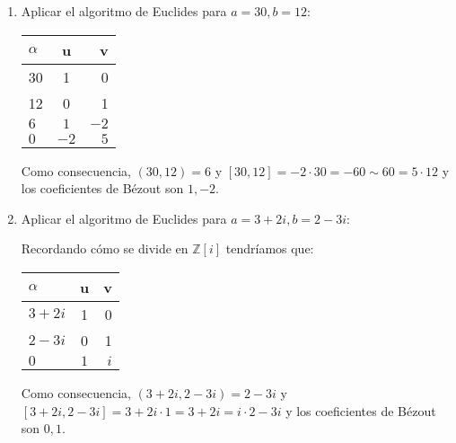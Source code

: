 \begin{example}
\begin{enumerate}
\item Aplicar el algoritmo de Euclides para $a = 30,b = 12$:

\begin{center}
  \begin{tabular}{ | l | c | r |}
    \hline
    $\alpha$ & u & v \\ \hline
    30 & 1 & 0 \\ \hline
    12 & 0 & 1 \\ \hline
    $6$ & $1$ & $-2$ \\ \hline
    $0$ & $-2$ & $5$ \\ \hline
  \end{tabular}
\end{center}

Como consecuencia, $(30,12) = 6$ y $[30,12] = -2 \cdot 30 = -60 \sim 60 = 5 \cdot 12$ y los coeficientes de Bézout son $1,-2$. 

\item Aplicar el algoritmo de Euclides para $a = 3+2i,b = 2-3i$:

Recordando cómo se divide en $\mathbb{Z}[i]$ tendríamos que:

\begin{center}
  \begin{tabular}{ | l | c | r |}
    \hline
    $\alpha$ & u & v \\ \hline
    $3+2i$ & 1 & 0 \\ \hline
    $2-3i$ & 0 & 1 \\ \hline
    $0$ & $1$ & $i$ \\ \hline
  \end{tabular}
\end{center}

Como consecuencia, $(3+2i,2-3i) = 2-3i$ y $[3+2i,2-3i] = 3+2i \cdot 1 = 3+2i = i \cdot 2-3i$ y los coeficientes de Bézout son $0,1$. 
\end{enumerate}
\end{example}

